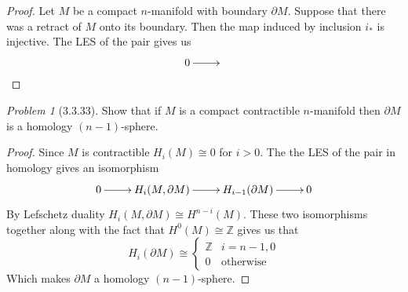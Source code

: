 \documentclass[10pt]{article}
\newcommand{\sk}{\vskip 10mm}
\newcommand{\bb}[1]{\mathbb{#1}}
\theoremstyle{remark}
\newtheorem{problem}{Problem}
\begin{document}
\begin{proof}
  Let $M$ be a compact $n$-manifold with boundary $\partial M$. Suppose that
  there was a retract of $M$ onto its boundary. Then the map induced
  by inclusion $i_*$ is injective. The LES of the pair gives us
  \[
    \xymatrix{
      0 \ar[r] & 
    }
  \]
\end{proof}

\sk

\begin{problem}[3.3.33]
  Show that if $M$ is a compact contractible $n$-manifold then $\partial M$ is a
  homology $(n-1)$-sphere.
\end{problem}

\begin{proof}
  Since $M$ is contractible $H_i(M)\cong 0$ for $i>0$. The the LES of the pair in
  homology gives an isomorphism
  \[
    \xymatrix{
      0 \ar[r] & H_i(M,\partial M) \ar[r] & H_{i-1}(\partial M) \ar[r] & 0
    }
  \]
  By Lefschetz duality $H_i(M,\partial M)\cong H^{n-i}(M)$. These two isomorphisms together
  along with the fact that $H^0(M)\cong \bb{Z}$ gives us that
  \[
    H_i(\partial M) \cong
    \left\{
      \begin{array}{lr}
        \bb{Z} & i=n-1,0\\
        0 & \text{otherwise}
      \end{array}
    \right.
  \]
  Which makes $\partial M$ a homology $(n-1)$-sphere.
\end{proof}
\end{document}
